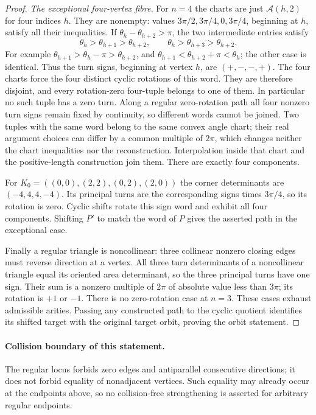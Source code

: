 \begin{proof}
\emph{The exceptional four-vertex fibre.}
For $n=4$ the charts are just $\mathcal A(h,2)$ for four indices $h$.
They are nonempty: values $3\pi/2,3\pi/4,0,3\pi/4$, beginning at $h$,
satisfy all their inequalities. If $\theta_h-\theta_{h+2}>\pi$, the two
intermediate entries satisfy
\begin{equation}\label{transport:four-orders}
 \theta_h>\theta_{h+1}>\theta_{h+2},\qquad
 \theta_h>\theta_{h+3}>\theta_{h+2}.
\end{equation}
For example $\theta_{h+1}>\theta_h-\pi>\theta_{h+2}$, and
$\theta_{h+1}<\theta_{h+2}+\pi<\theta_h$; the other case is identical.
Thus the turn signs, beginning at vertex $h$, are $(+,-,-,+)$.
The four charts force the four distinct cyclic rotations of this word.
They are therefore disjoint, and every rotation-zero four-tuple belongs to
one of them. In particular no such tuple has a zero turn. Along a regular
zero-rotation path all four nonzero turn signs remain fixed by continuity,
so different words cannot be joined. Two tuples with the same word belong
to the same convex angle chart; their real argument choices can differ by
a common multiple of $2\pi$, which changes neither the chart inequalities
nor the reconstruction. Interpolation inside that chart and the positive-length
construction join them. There are exactly four components.

For $K_0=((0,0),(2,2),(0,2),(2,0))$ the corner determinants are
$(-4,4,4,-4)$. Its principal turns are the corresponding signs times
$3\pi/4$, so its rotation is zero. Cyclic shifts rotate this sign word and
exhibit all four components. Shifting $P'$ to match the word of $P$ gives
the asserted path in the exceptional case.

Finally a regular triangle is noncollinear: three collinear nonzero closing
edges must reverse direction at a vertex. All three turn determinants of a
noncollinear triangle equal its oriented area determinant, so the three
principal turns have one sign. Their sum is a nonzero multiple of $2\pi$
of absolute value less than $3\pi$; its rotation is $+1$ or $-1$.
There is no zero-rotation case at $n=3$. These cases exhaust admissible
arities. Passing any constructed path to the cyclic quotient identifies
its shifted target with the original target orbit, proving the orbit statement.
\end{proof}

\paragraph{Collision boundary of this statement.}
The regular locus forbids zero edges and antiparallel consecutive directions;
it does not forbid equality of nonadjacent vertices. Such equality may already
occur at the endpoints above, so no collision-free strengthening is asserted
for arbitrary regular endpoints.

